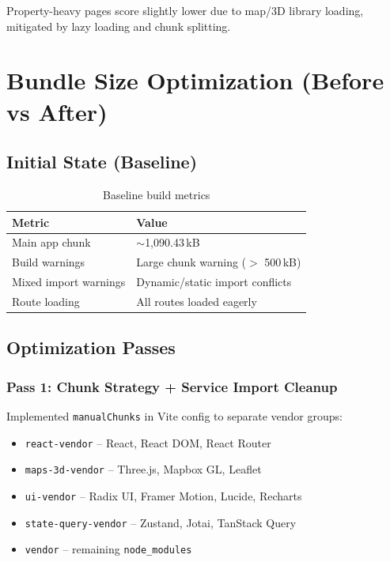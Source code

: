 \documentclass[12pt,a4paper]{article}
\begin{document}
\noindent Property-heavy pages score slightly lower due to map/3D library loading, mitigated by lazy loading and chunk splitting.

\section{Bundle Size Optimization (Before vs After)}

\subsection{Initial State (Baseline)}

\begin{table}[H]
\centering
\begin{tabularx}{\textwidth}{lX}
\toprule
\textbf{Metric} & \textbf{Value} \\
\midrule
Main app chunk           & $\sim$1,090.43\,kB \\
Build warnings           & Large chunk warning ($>$ 500\,kB) \\
Mixed import warnings    & Dynamic/static import conflicts \\
Route loading            & All routes loaded eagerly \\
\bottomrule
\end{tabularx}
\caption{Baseline build metrics}
\end{table}

\subsection{Optimization Passes}

\subsubsection{Pass 1: Chunk Strategy + Service Import Cleanup}

Implemented \texttt{manualChunks} in Vite config to separate vendor groups:

\begin{itemize}[noitemsep]
    \item \texttt{react-vendor} -- React, React DOM, React Router
    \item \texttt{maps-3d-vendor} -- Three.js, Mapbox GL, Leaflet
    \item \texttt{ui-vendor} -- Radix UI, Framer Motion, Lucide, Recharts
    \item \texttt{state-query-vendor} -- Zustand, Jotai, TanStack Query
    \item \texttt{vendor} -- remaining \texttt{node\_modules}
\end{itemize}
\end{document}
